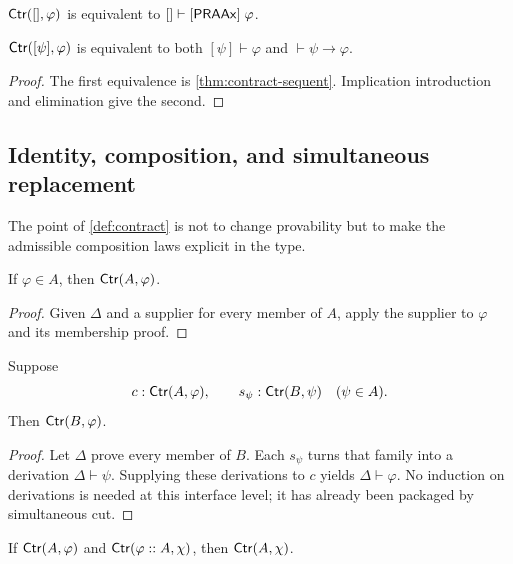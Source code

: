 \begin{corollary}
\(\mathsf{Ctr}([],\varphi)\) is equivalent to \([]\mathrel{\vdash[\mathsf{PRAAx}]}\varphi\).
\end{corollary}

\begin{corollary}
\(\mathsf{Ctr}([\psi],\varphi)\) is equivalent to both \([\psi]\vdash\varphi\) and \(\vdash\psi\to\varphi\).
\end{corollary}

\begin{proof}
The first equivalence is \cref{thm:contract-sequent}.  Implication introduction and elimination give the second.
\end{proof}

\subsection{Identity, composition, and simultaneous replacement}

The point of \cref{def:contract} is not to change provability but to make the admissible composition laws explicit in the type.

\begin{lemma}[Identity]
If \(\varphi\in A\), then \(\mathsf{Ctr}(A,\varphi)\).
\end{lemma}

\begin{proof}
Given \(\Delta\) and a supplier for every member of \(A\), apply the supplier to \(\varphi\) and its membership proof.
\end{proof}

\begin{theorem}\label{thm:contract-cut}
Suppose
\[
 c:\mathsf{Ctr}(A,\varphi),
 \qquad
 s_\psi:\mathsf{Ctr}(B,\psi)\quad(\psi\in A).
\]
Then \(\mathsf{Ctr}(B,\varphi)\).
\end{theorem}

\begin{proof}
Let \(\Delta\) prove every member of \(B\).  Each \(s_\psi\) turns that family into a derivation \(\Delta\vdash\psi\).  Supplying these derivations to \(c\) yields \(\Delta\vdash\varphi\).  No induction on derivations is needed at this interface level; it has already been packaged by simultaneous cut.
\end{proof}

\begin{corollary}
If \(\mathsf{Ctr}(A,\varphi)\) and \(\mathsf{Ctr}(\varphi::A,\chi)\), then \(\mathsf{Ctr}(A,\chi)\).
\end{corollary}

